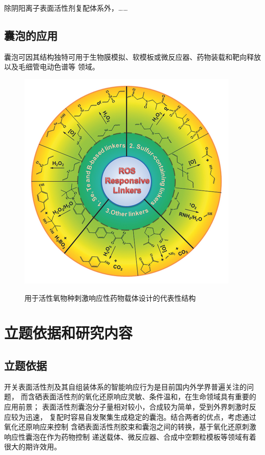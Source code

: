 \documentclass[bachelor,fandolfonts,replaceperiod]{jnuthesis}
\begin{document}
    除阴阳离子表面活性剂复配体系外，……
        
    \subsection{囊泡的应用}
    囊泡可因其结构独特可用于生物膜模拟、软模板或微反应器、药物装载和靶向释放以及毛细管电动色谱等
    领域\cite{蒋玲玲2018}。
    
    \begin{figure}[htbp]
        \centering
        \includegraphics[width= .426\textwidth]{figure/vesicle-ros.png}\\
        \caption{用于活性氧物种刺激响应性药物载体设计的代表性结构\cite{saravanakumar2017}}
        \label{fig:vesicle-ros}
    \end{figure}
    
    \section{立题依据和研究内容}
    \subsection{立题依据}
    开关表面活性剂及其自组装体系的智能响应行为是目前国内外学界普遍关注的问题，
    而含硒表面活性剂的氧化还原响应灵敏、条件温和，在生命领域具有重要的应用前景；
    表面活性剂囊泡分子量相对较小，合成较为简单，受到外界刺激时反应较为迅速，
    复配时容易自发聚集生成稳定的囊泡。结合两者的优点，考虑通过氧化还原响应来控制
    含硒表面活性剂胶束和囊泡之间的转换，基于氧化还原刺激响应性囊泡在作为药物控制
    递送载体、微反应器、合成中空颗粒模板等领域有着很大的期许效用。
    
\end{document}
